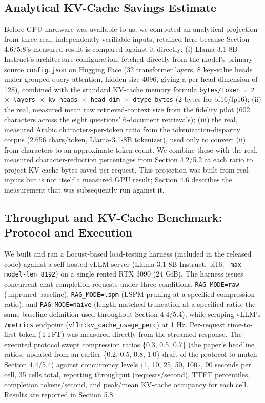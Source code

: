 \subsection{Analytical KV-Cache Savings Estimate}
Before GPU hardware was available to us, we computed an analytical projection from three real, independently verifiable inputs, retained here because Section 4.6/5.8's measured result is compared against it directly: (i) Llama-3.1-8B-Instruct's architecture configuration, fetched directly from the model's primary-source \texttt{config.json} on Hugging Face (32 transformer layers, 8 key-value heads under grouped-query attention, hidden size 4096, giving a per-head dimension of 128), combined with the standard KV-cache memory formula \texttt{bytes/token = 2 $\times$ layers $\times$ kv\_heads $\times$ head\_dim $\times$ dtype\_bytes} (2 bytes for bf16/fp16); (ii) the real, measured mean raw retrieved-context size from the fidelity pilot (602 characters across the eight questions' 6-document retrievals); (iii) the real, measured Arabic characters-per-token ratio from the tokenization-disparity corpus (2.656 chars/token, Llama-3.1-8B tokenizer), used only to convert (ii) from characters to an approximate token count. We combine these with the real, measured character-reduction percentages from Section 4.2/5.2 at each ratio to project KV-cache bytes saved per request. This projection was built from real inputs but is not itself a measured GPU result; Section 4.6 describes the measurement that was subsequently run against it.

\subsection{Throughput and KV-Cache Benchmark: Protocol and Execution}
We built and ran a Locust-based load-testing harness (included in the released code) against a self-hosted vLLM server (Llama-3.1-8B-Instruct, bf16, \texttt{--max-model-len 8192}) on a single rented RTX 3090 (24 GiB). The harness issues concurrent chat-completion requests under three conditions, \texttt{RAG\_MODE=raw} (unpruned baseline), \texttt{RAG\_MODE=lspm} (LSPM pruning at a specified compression ratio), and \texttt{RAG\_MODE=naive} (length-matched truncation at a specified ratio, the same baseline definition used throughout Section 4.4/5.4), while scraping vLLM's \texttt{/metrics} endpoint (\texttt{vllm:kv\_cache\_usage\_perc}) at 1 Hz. Per-request time-to-first-token (TTFT) was measured directly from the streamed response. The executed protocol swept compression ratios \{0.3, 0.5, 0.7\} (the paper's headline ratios, updated from an earlier \{0.2, 0.5, 0.8, 1.0\} draft of the protocol to match Section 4.4/5.4) against concurrency levels \{1, 10, 25, 50, 100\}, 90 seconds per cell, 35 cells total, reporting throughput (requests/second), TTFT percentiles, completion tokens/second, and peak/mean KV-cache occupancy for each cell. Results are reported in Section 5.8.


